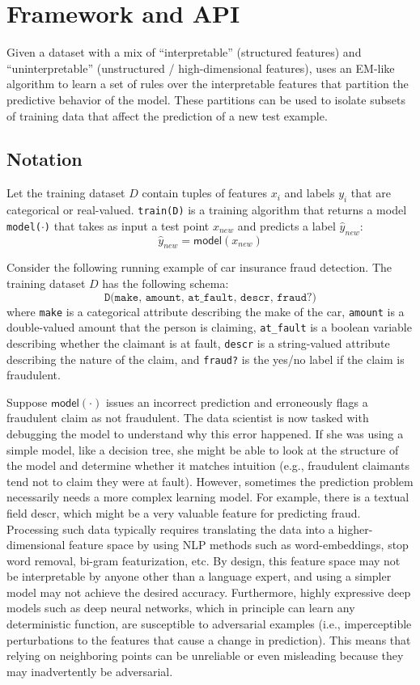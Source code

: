 \section{Framework and API}
Given a dataset with a mix of ``interpretable'' (structured features) and ``uninterpretable'' (unstructured / high-dimensional features), \sys uses an EM-like algorithm to learn a set of rules over the interpretable features that partition the predictive behavior of the model.
These partitions can be used to isolate subsets of training data that affect the prediction of a new test example.

\subsection{Notation}
Let the training dataset $D$ contain tuples of features $x_i$ and labels $y_i$ that are categorical or real-valued.
\texttt{train(D)} is a training algorithm that returns a model \texttt{model($\cdot$)} that takes as input a test point $x_{new}$ and predicts a label $\hat{y}_{new}$:
\[
\hat{y}_{new} = \textsf{model}(x_{new})
\]

Consider the following running example of car insurance fraud detection. The training dataset $D$ has the following schema:
\[
\texttt{D(make, amount, at\_fault, descr, fraud?)}
\]
where \texttt{make} is a categorical attribute describing the make of the car, \texttt{amount} is a double-valued amount that the person is claiming, \texttt{at\_fault} is a boolean variable describing whether the claimant is at fault, \texttt{descr} is a string-valued attribute describing the nature of the claim, and \texttt{fraud?} is the yes/no label if the claim is fraudulent.

Suppose $\textsf{model}(\cdot)$ issues an incorrect prediction and erroneously flags a fraudulent claim as not fraudulent. The data scientist is now tasked with debugging the model to understand why this error happened. 
If she was using a simple model, like a decision tree, she might be able to look at the structure of the model and determine whether it matches intuition (e.g., fraudulent claimants tend not to claim they were at fault).
However, sometimes the prediction problem necessarily needs a more complex learning model. For example, there is a textual field \textsf{descr}, which might be a very valuable feature for predicting fraud. Processing such data typically requires translating the data into a higher-dimensional feature space by using NLP methods such as word-embeddings, stop word removal, bi-gram featurization, etc.  By design, this feature space may not be interpretable by anyone other than a language expert, and using a simpler model may not achieve the desired accuracy. Furthermore, highly expressive deep models such as deep neural networks, which in principle can learn any deterministic function, are susceptible to adversarial examples (i.e., imperceptible perturbations to the features that cause a change in prediction)\cite{szegedy2013intriguing}. 
This means that relying on neighboring points can be unreliable or even misleading because they may inadvertently be adversarial.  

